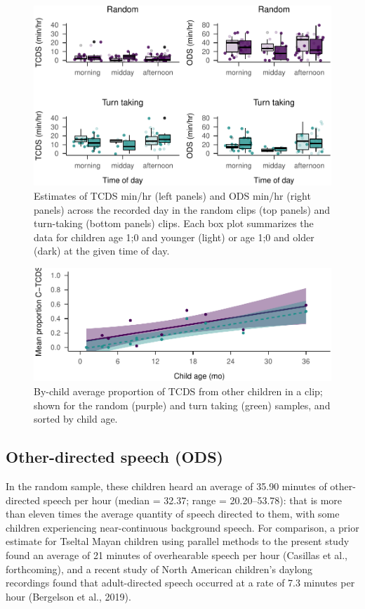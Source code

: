 \documentclass[,man,floatsintext]{apa6}
\begin{document}
\begin{figure}
\centering
\includegraphics{Yeli-CLE_files/figure-latex/fig4-1.pdf}
\caption{\label{fig:fig4}Estimates of TCDS min/hr (left panels) and ODS
min/hr (right panels) across the recorded day in the random clips (top
panels) and turn-taking (bottom panels) clips. Each box plot summarizes
the data for children age 1;0 and younger (light) or age 1;0 and older
(dark) at the given time of day.}
\end{figure}

\begin{figure}
\centering
\includegraphics{Yeli-CLE_files/figure-latex/fig5-1.pdf}
\caption{\label{fig:fig5}By-child average proportion of TCDS from other
children in a clip; shown for the random (purple) and turn taking
(green) samples, and sorted by child age.}
\end{figure}

\subsection{Other-directed speech
(ODS)}\label{other-directed-speech-ods}

In the random sample, these children heard an average of 35.90 minutes
of other-directed speech per hour (median = 32.37; range =
20.20--53.78): that is more than eleven times the average quantity of
speech directed to them, with some children experiencing near-continuous
background speech. For comparison, a prior estimate for Tseltal Mayan
children using parallel methods to the present study found an average of
21 minutes of overhearable speech per hour (Casillas et al.,
forthcoming), and a recent study of North American children's daylong
recordings found that adult-directed speech occurred at a rate of 7.3
minutes per hour (Bergelson et al., 2019).
\end{document}
